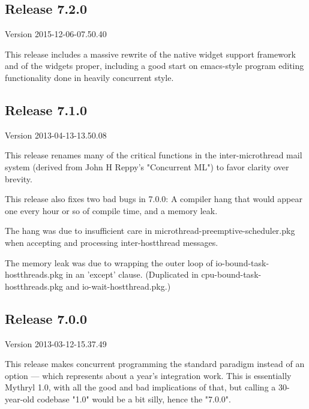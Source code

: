 
\subsection{Release 7.2.0}
\label{section:src:release-7.2.0}

Version 2015-12-06-07.50.40

This release includes a massive rewrite of the native widget support framework 
and of the widgets proper, including a good start on emacs-style program editing 
functionality done in heavily concurrent style.


\cutend*

\subsection{Release 7.1.0}
\label{section:src:release-7.1.0}

Version 2013-04-13-13.50.08

This release renames many of the critical functions in the inter-microthread 
mail system (derived from John H Reppy's "Concurrent ML") to favor clarity over 
brevity.

This release also fixes two bad bugs in 7.0.0:  A compiler hang that would appear 
one every hour or so of compile time, and a memory leak.

The hang was due to 
insufficient care in microthread-preemptive-scheduler.pkg when accepting and 
processing inter-hostthread messages.

The memory leak was due to wrapping the 
outer loop of io-bound-task-hostthreads.pkg in an 'except' clause. (Duplicated 
in cpu-bound-task-hostthreads.pkg and io-wait-hostthread.pkg.)


\cutend*

\subsection{Release 7.0.0}
\label{section:src:release-7.0.0}

Version 2013-03-12-15.37.49

This release makes concurrent programming the standard paradigm instead 
of an option --- which represents about a year's integration work.  This is essentially 
Mythryl 1.0, with all the good and bad implications of that, but calling a 30-year-old 
codebase "1.0" would be a bit silly, hence the "7.0.0".

